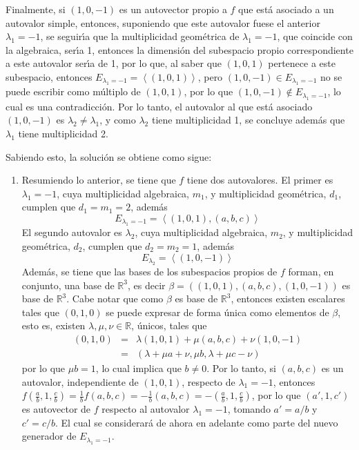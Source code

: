 \begin{solucion}
 \par 
 Finalmente, si $(1,0,-1)$ es un autovector propio a $f$ que est\'a asociado a un autovalor simple, entonces, suponiendo que este autovalor fuese el anterior $\lambda_1=-1$, se seguir\'{\i}a que la multiplicidad geom\'etrica de $\lambda_1 = -1$, que coincide con la algebraica, ser\'{\i}a 1, entonces la dimensi\'on del subespacio propio correspondiente a este autovalor ser\'{\i}a de 1, por lo que, al saber que $(1,0,1)$ pertenece a este subespacio, entonces $E_{\lambda_1=-1}= \left< (1,0,1)\right>$, pero $(1,0,-1) \in E_{\lambda_1=-1}$ no se puede escribir como m\'ultiplo de $(1,0,1)$, por lo que $(1,0,-1)\not\in E_{\lambda_1 = -1}$, lo cual es una contradicci\'on. Por lo tanto, el autovalor al que est\'a asociado $(1,0,-1)$ es $\lambda_2 \neq \lambda_1$, y como $\lambda_2$ tiene multiplicidad 1, se concluye adem\'as que $\lambda_1$ tiene multiplicidad 2.
 \par 
 Sabiendo esto, la soluci\'on se obtiene como sigue:
 \begin{enumerate}[$a$)]
  \item Resumiendo lo anterior, se tiene que $f$ tiene dos autovalores. El primer es $\lambda_1 = -1$, cuya multiplicidad algebraica, $m_1$, y multiplicidad geom\'etrica, $d_1$, cumplen que $d_1 = m_1 = 2$, adem\'as
  \begin{equation*}
   E_{\lambda_1 = -1} = \left< (1,0,1), (a,b,c) \right>
  \end{equation*}
  El segundo autovalor es $\lambda_2$, cuya multiplicidad algebraica, $m_2$, y multiplicidad geom\'etrica, $d_2$, cumplen que $d_2 = m_2 = 1$, adem\'as
  \begin{equation*}
   E_{\lambda_2} = \left< (1,0,-1) \right>
  \end{equation*}
  Adem\'as, se tiene que las bases de los subespacios propios de $f$ forman, en conjunto, una base de $\mathbb{R}^3$, es decir $\beta = \left( (1,0,1), (a, b, c), (1,0,-1) \right)$ es base de $\mathbb{R}^3$. Cabe notar que como $\beta$ es base de $\mathbb{R}^3$, entonces existen escalares tales que $(0,1,0)$ se puede expresar de forma \'unica como elementos de $\beta$, esto es, existen $\lambda, \mu, \nu \in \mathbb{R}$, \'unicos, tales que 
  \begin{eqnarray*}
   (0,1,0) & = & \lambda (1,0,1) + \mu (a,b,c) + \nu (1,0,-1) \\ 
   & = & (\lambda + \mu a + \nu, \mu b, \lambda + \mu c - \nu )
  \end{eqnarray*}
  por lo que $\mu b = 1$, lo cual implica que $b \neq 0$. Por lo tanto, si $(a,b,c)$ es un autovalor, independiente de $(1,0,1)$, respecto de $\lambda_1 = -1$, entonces $f\left( \frac{a}{b}, 1, \frac{c}{b} \right) = \frac{1}{b}f(a,b,c) = -\frac{1}{b}(a,b,c) = -\left(\frac{a}{b}, 1, \frac{c}{b} \right)$, por lo que $(a', 1, c')$ es autovector de $f$ respecto al autovalor $\lambda_1 = -1$, tomando $a'= a/b$ y $c'=c/b$. El cual se considerar\'a de ahora en adelante como parte del nuevo generador de $E_{\lambda_1 = -1}$.

\end{enumerate}
\end{solucion}
